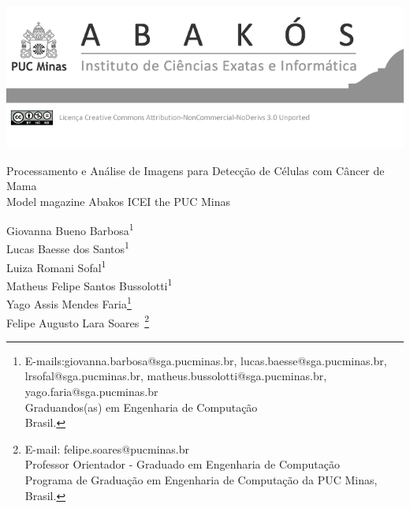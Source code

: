 \documentclass[a4paper,12pt,Times]{article}
\makeatletter
\newcommand{\monog}{Processamento e Análise de Imagens para Detecção de Células com Câncer de Mama}
\newcommand{\monogES}{Model magazine Abakos ICEI the PUC Minas}
\newcommand{\origem}{Brasil}
\newcommand{\AutorA}{Giovanna Bueno Barbosa\textsuperscript{1}}
\newcommand{\EmailA}{giovanna.barbosa@sga.pucminas.br}
\newcommand{\AutorB}{Lucas Baesse dos Santos\textsuperscript{1}}
\newcommand{\EmailB}{lucas.baesse@sga.pucminas.br}
\newcommand{\AutorC}{Luiza Romani Sofal\textsuperscript{1}}
\newcommand{\EmailC}{lrsofal@sga.pucminas.br}
\newcommand{\AutorD}{Matheus Felipe Santos Bussolotti\textsuperscript{1}}
\newcommand{\EmailD}{matheus.bussolotti@sga.pucminas.br}
\newcommand{\AutorE}{Yago Assis Mendes Faria}
\newcommand{\EmailE}{yago.faria@sga.pucminas.br}
\newcommand{\AutorF}{Felipe Augusto Lara Soares}
\newcommand{\EmailF}{felipe.soares@pucminas.br}
\newcommand{\FuncaoA}{Graduandos(as) em Engenharia de Computação}
\newcommand{\FuncaoB}{Professor Orientador - Graduado em Engenharia de Computação}
\newcommand{\Curso}{Programa de Graduação em Engenharia de Computação da PUC Minas}
\makeatother
\begin{document}

\begin{flushleft}

\begin{minipage} [c][5cm][b]{16.5cm} %
\includegraphics[scale=2.8]{figuras/pucmg.png} 
\end{minipage}

 \vspace{0cm} {
 \singlespacing \Large{\monog {} \\ }
  \normalsize{\monogES}
 }
\end{flushleft}
\begin{flushright}
\singlespacing 

\normalsize{\AutorA \\ \AutorB \\ \AutorC \\ \AutorD \\ \AutorE \footnote{E-mails:\EmailA, \EmailB, \EmailC, \EmailD, \EmailE \\ \FuncaoA \\ \origem.}} \\
\normalsize{\AutorF\ \footnote{E-mail: \EmailF \\ \FuncaoB \\ \Curso, \origem.}} 

\end{flushright}
\thispagestyle{empty}
\end{document}
